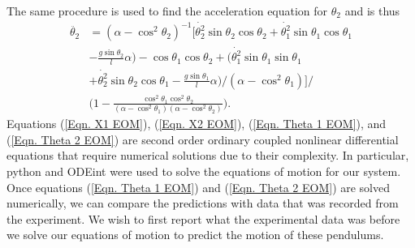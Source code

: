 \documentclass[twocolumn]{article}
\begin{document}
The same procedure is used to find the acceleration equation for $\theta_{2}$ and is thus
\begin{equation}\label{Eqn. Theta 2 EOM}
\begin{split}
\ddot{\theta_{2}}&=(\alpha-\cos^2{\theta_2})^{-1}\Bigg[\dot{\theta_{2}^2}\sin{\theta_{2}}\cos{\theta_{2}}+\dot{\theta_{1}^2}\sin{\theta_{1}}\cos{\theta_{1}}\\&
-\frac{g\sin{\theta_{2}}}{l}\alpha)-\cos{\theta_{1}}\cos{\theta_{2}}+\Big(\dot{\theta_{1}^2}\sin{\theta_{1}}\sin{\theta_{1}}\\&
+\dot{\theta_{2}^2}\sin{\theta_{2}}\cos{\theta_{1}}-\frac{g\sin{\theta_{1}}}{l}\alpha\Big)/(\alpha-\cos^2{\theta_1})\Bigg]/ \\&
\Bigg(1-\frac{\cos^2{\theta_{1}}\cos^2{\theta_{2}}}{(\alpha-\cos^2{\theta_1})(\alpha-\cos^2{\theta_2})}\Bigg).
\end{split}
\end{equation}
Equations (\ref{Eqn. X1 EOM}), (\ref{Eqn. X2 EOM}), (\ref{Eqn. Theta 1 EOM}), and (\ref{Eqn. Theta 2 EOM}) are second order ordinary coupled nonlinear differential equations that require numerical solutions due to their complexity. In particular, python and ODEint were used to solve the equations of motion for our system. Once equations (\ref{Eqn. Theta 1 EOM}) and (\ref{Eqn. Theta 2 EOM}) are solved numerically, we can compare the predictions with data that was recorded from the experiment. We wish to first report what the experimental data was before we solve our equations of motion to predict the motion of these pendulums.
\end{document}
